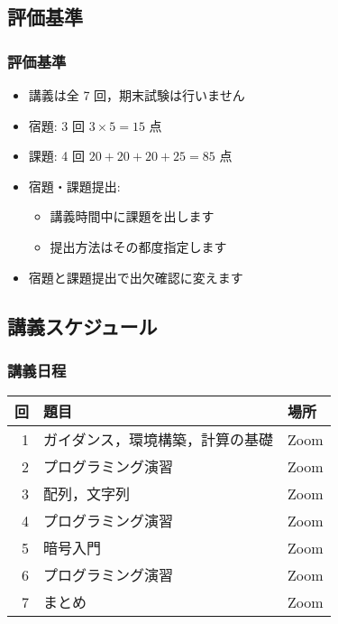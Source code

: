 \subsection{評価基準}
\begin{frame}
\frametitle{評価基準}
  \begin{itemize}
\item 講義は全 7 回，期末試験は行いません
\item 宿題: 3 回 \(3\times 5=15\) 点
\item 課題: 4 回 \(20+20+20+25=85\) 点
\item 宿題・課題提出: 
    \begin{itemize}
\item 講義時間中に課題を出します
\item 提出方法はその都度指定します
    \end{itemize}
\item 宿題と課題提出で出欠確認に変えます
  \end{itemize}
\end{frame}
%
%
\subsection{講義スケジュール}
\begin{frame}
\frametitle{講義日程}
  \begin{center}
    \begin{tabular}{rll}
回&題目&場所\\
\hline
1&ガイダンス，環境構築，計算の基礎& Zoom\\
2&プログラミング演習&  Zoom\\
3&配列，文字列& Zoom\\
4&プログラミング演習& Zoom\\
5&暗号入門& Zoom\\
6&プログラミング演習& Zoom\\
7&まとめ& Zoom
    \end{tabular}
  \end{center}
\end{frame}
